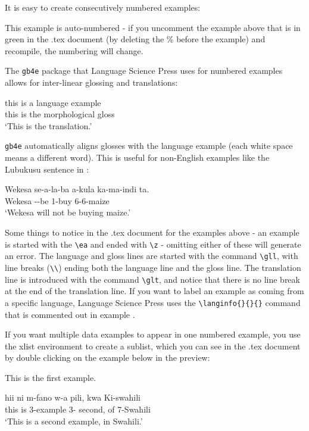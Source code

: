 \documentclass[output=paper,colorlinks,citecolor=brown]{langscibook}
\begin{document}
It is easy to create consecutively numbered examples: 


\ea 
This example is auto-numbered - if you uncomment the example above that is in green in the .tex document (by deleting the \% before the example) and recompile, the numbering will change.
\z 

\noindent The \texttt{gb4e} package that Language Science Press uses for numbered examples allows for inter-linear glossing and translations: 

\ea 
\gll this is a language example \\
this is the morphological gloss \\
\glt `This is the translation.' 
\z 

\noindent  \texttt{gb4e} automatically aligns glosses with the language example (each white space means a different word). This is useful for non-English examples like the Lubukusu sentence in : 

\ea \label{ex:diercks:BukusuNegation}
\gll Wekesa se-a-la-ba a-kula ka-ma-indi ta. \\
Wekesa \Sm-\Fut-be 1\Sm-buy 6-6-maize \Neg{} \\ 
\glt `Wekesa will not be buying maize.'
\z

\noindent Some things to notice in the .tex document for the examples above - an example is started with the \verb|\ea| and ended with \verb|\z| - omitting either of these will generate an error. The language and gloss lines are started with the command \verb|\gll|, with line breaks (\verb|\\|) ending both the language line and the gloss line. The translation line is introduced with the command \verb|\glt|, and notice that there is no line break at the end of the translation line. If you want to label an example as coming from a specific language, Language Science Press uses the \verb|\langinfo{}{}{}| command that is commented out in example .

If you want multiple data examples to appear in one numbered example, you use the xlist environment to create a sublist, which you can see in the .tex document by double clicking on the example below in the preview: 

\ea \label{ex:diercks:XlistExample}
\begin{xlist}

\ex This is the first example. 

\ex \label{ex:diercks:SwahiliXlist}
\gll hii ni m-fano w-a pili, kwa Ki-swahili \\
this is 3-example 3-\Assoc{} second, of 7-Swahili \\
\glt `This is a second example, in Swahili.' 

\end{xlist}
\end{document}
